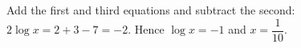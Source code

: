 Add the first and third equations and subtract the second: $2\log x=2+3-7=-2$. Hence $\log x=-1$ and $\boxed{x=\dfrac{1}{10}}$.

